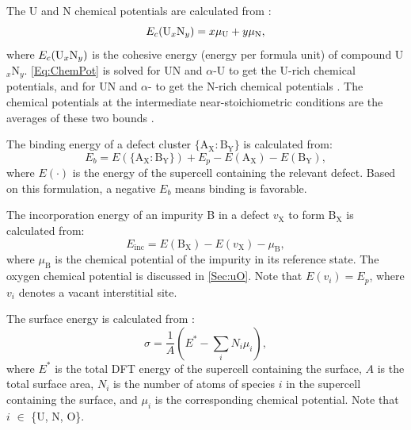 \documentclass[preprint,12pt,sort&compress]{elsarticle}
\newcommand{\?}{\stackrel{?}{=}}
\begin{document}
The U and N chemical potentials are calculated from \cite{AbdulHameed2024}:
\begin{equation}
E_c(\text{U}_{x}\text{N}_{y}) = x \mu_{\ce{U}} + y \mu_{\ce{N}},
\label{Eq:ChemPot}
\end{equation}
where $E_c(\ce{U$_{x}$N$_{y}$})$ is the cohesive energy (energy per formula unit) of compound U$_x$N$_y$. \cref{Eq:ChemPot} is solved for UN and $\alpha$-U to get the U-rich chemical potentials, and for UN and $\alpha$- to get the N-rich chemical potentials \cite{Huang2020, Yang2021}. The chemical potentials at the intermediate near-stoichiometric conditions are the averages of these two bounds \cite{Woodward1998}.

The binding energy of a defect cluster $\{\text{A}_\text{X} \! : \! \text{B}_\text{Y}\}$ is calculated from:
\begin{equation}
E_b = E(\{\text{A}_\text{X} \! : \! \text{B}_\text{Y}\}) + E_p - E(\text{A}_\text{X}) - E(\text{B}_\text{Y}),
\end{equation}
where $E(\cdot)$ is the energy of the supercell containing the relevant defect. Based on this formulation, a negative $E_b$ means binding is favorable.

The incorporation energy of an impurity B in a defect $v_\text{X}$ to form B$_\text{X}$ is calculated from:
\begin{equation}
E_\text{inc} = E( \text{B}_\text{X} ) - E( v_\text{X} ) - \mu_\text{B},
\end{equation}
where $\mu_\text{B}$ is the chemical potential of the impurity in its reference state. The oxygen chemical potential is discussed in \cref{Sec:uO}. Note that $E( v_i ) = E_p$, where $v_i$ denotes a vacant interstitial site. %

The surface energy is calculated from \cite{Finnis2005}:
\begin{equation}
\sigma = \frac{1}{A} \left( E^* - \sum_{i} N_i \mu_i \right),
\label{Eq:Sigma}
\end{equation}
where $E^*$ is the total DFT energy of the supercell containing the surface, $A$ is the total surface area, $N_i$ is the number of atoms of species $i$ in the supercell containing the surface, and $\mu_i$ is the corresponding chemical potential. Note that $i$ $\in$ \{U, N, O\}.
\end{document}
